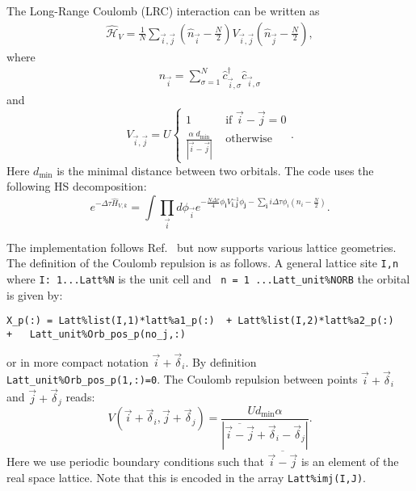 The Long-Range Coulomb (LRC) interaction can be written as
\begin{align}
\hat{\mathcal{H}}_{V} =
\frac{1} { N } \sum_{\vec{i},\vec{j}}  \left(  \hat{n}_{\vec{i}} -  \frac{N}{2}  \right)  V_{\vec{i},\vec{j}} \left(  \hat{n}_{\vec{j}} -  \frac{N}{2}  \right), 
\end{align} 
where
\begin{align}
\hat{n}_{\vec{i}} = \sum_{\sigma=1}^{N}  \hat{c}^{\dagger}_{\vec{i},\sigma}  \hat{c}^{}_{\vec{i},\sigma}
\end{align} 
and
\begin{equation}
V_{\vec{i}, \vec{j}}   =   U \left\{
\begin{array}{ll}  
1          &   \text{ if } \vec{i} - \vec{j}    = 0 \\
\frac{\alpha   \;   d_\mathrm{min}}{ |   \vec{i} - \vec{j} | } &     \text{ otherwise }
\end{array}
\right. .
\end{equation}
Here $d_\mathrm{min}$ is the minimal distance between two orbitals.     The code uses the following  HS decomposition:
\begin{equation}
e^{-\Delta \tau \hat{H}_{V,k} }  =  \int \prod_{\vec{i}} d \phi_{\vec{i}}   e^{ - \frac{N \Delta \tau} {4} \phi_{\pmb{i}} V^{-1}_{\pmb{i},\pmb{j}}  \phi_{\pmb{j}} - \sum_{\pmb{i}}  i \Delta \tau \phi_i \left( n_{i} - \frac{N}{2} \right) }.
\end{equation}

The implementation follows Ref.~\cite{Hohenadler14}  but now supports various lattice geometries.    The definition of  the Coulomb repulsion is as follows. 
A general lattice site  \texttt{I,n}   where \texttt{I: 1...Latt\%N} is the unit cell and \texttt{ n = 1 ...Latt\_unit\%NORB}  the orbital  is given by: 
\begin{lstlisting}[style=fortran]
X_p(:) = Latt%list(I,1)*latt%a1_p(:)  + Latt%list(I,2)*latt%a2_p(:) 
+   Latt_unit%Orb_pos_p(no_j,:)
\end{lstlisting}
or in more compact notation $ \vec{i}  + \vec{\delta}_i $.   By definition \texttt{Latt\_unit\%Orb\_pos\_p(1,:)=0}.
The Coulomb repulsion between points   $ \vec{i}  + \vec{\delta}_i $   and $ \vec{j}  + \vec{\delta}_j $   reads: 
\begin{equation}
V(\vec{i}  + \vec{\delta}_i ,  \vec{j}  + \vec{\delta}_j  )  =  \frac{U d_\mathrm{min} \alpha}{  |  \overline{\vec{i} - \vec{j}} + \vec{\delta}_i - \vec{\delta}_j  |}.
\end{equation}
Here  we use periodic boundary conditions such that  $\overline{\vec{i} - \vec{j}}$  is an element of the real space lattice. Note that this is encoded in the array \texttt{Latt\%imj(I,J)}.

